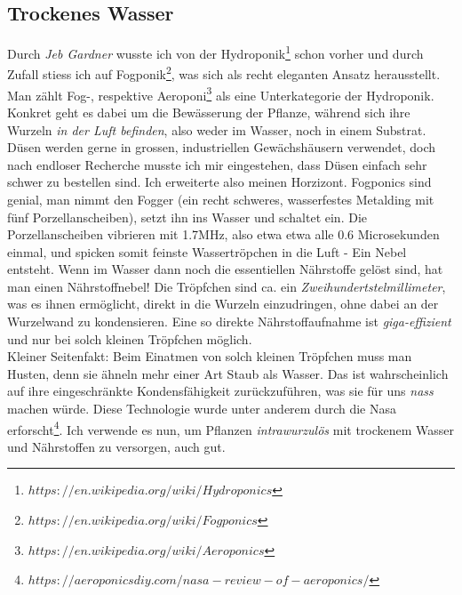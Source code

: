 \documentclass[12pt,titlepage,a4paper]{article}
\begin{document}
\subsection{Trockenes Wasser}
Durch\textit{ Jeb Gardner} wusste ich von der Hydroponik\footnote{$https://en.wikipedia.org/wiki/Hydroponics$} schon vorher und durch Zufall stiess ich auf Fogponik\footnote{$https://en.wikipedia.org/wiki/Fogponics$}, was sich als recht eleganten Ansatz herausstellt. Man zählt Fog-, respektive Aeroponi\footnote{$https://en.wikipedia.org/wiki/Aeroponics$} als eine Unterkategorie der Hydroponik. Konkret geht es dabei um die Bewässerung der Pflanze, während sich ihre Wurzeln \textit{in der Luft befinden}, also weder im Wasser, noch in einem Substrat. Düsen werden gerne in grossen, industriellen Gewächshäusern verwendet, doch nach endloser Recherche musste ich mir eingestehen, dass Düsen einfach sehr schwer zu bestellen sind. Ich erweiterte also meinen Horzizont. Fogponics sind genial, man nimmt den Fogger (ein recht schweres, wasserfestes Metalding mit fünf Porzellanscheiben), setzt ihn ins Wasser und schaltet ein. Die Porzellanscheiben vibrieren mit 1.7MHz, also etwa etwa alle 0.6 Microsekunden einmal, und spicken somit feinste Wassertröpchen in die Luft - Ein Nebel entsteht. Wenn im Wasser dann noch die essentiellen Nährstoffe gelöst sind, hat man einen Nährstoffnebel! Die Tröpfchen sind ca. ein \textit{Zweihundertstelmillimeter}, was es ihnen ermöglicht, direkt in die Wurzeln einzudringen, ohne dabei an der Wurzelwand zu kondensieren. Eine so direkte Nährstoffaufnahme ist \textit{giga-effizient} und nur bei solch kleinen Tröpfchen möglich.  \\ 
Kleiner Seitenfakt: Beim Einatmen von solch kleinen Tröpfchen muss man Husten, denn sie ähneln mehr einer Art Staub als Wasser. Das ist wahrscheinlich auf ihre eingeschränkte Kondensfähigkeit zurückzuführen, was sie für uns \textit{nass} machen würde. Diese Technologie wurde unter anderem durch die Nasa erforscht\footnote{$https://aeroponicsdiy.com/nasa-review-of-aeroponics/$}. Ich verwende es nun, um Pflanzen \textit{intrawurzulös} mit trockenem Wasser und Nährstoffen zu versorgen, auch gut.
\end{document}
